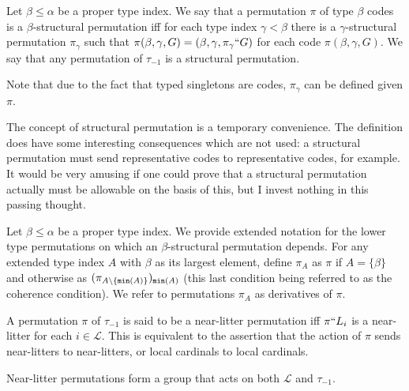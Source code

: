 \begin{definition}
\label {def:structural-perm}
Let $\beta\leq \alpha$ be a proper type index.  We say that a permutation $\pi$ of type $\beta$ codes is a $\beta$-structural permutation iff for each type index $\gamma<\beta$ there is a $\gamma$-structural permutation $\pi_\gamma$ such that
$\pi(\beta,\gamma,G) = (\beta,\gamma,\pi_\gamma``G)$ for each code $\pi(\beta,\gamma,G)$.  We say that any permutation of $\tau_{-1}$ is a structural permutation.

Note that due to the fact that typed singletons are codes, $\pi_\gamma$ can be defined given $\pi$.
\end{definition}

The concept of structural permutation is a temporary convenience.  The definition does have some interesting consequences which are not used:  a structural permutation must send representative codes to representative codes, for example.  It would be very amusing if one could prove that a structural permutation actually must be allowable on the basis of this,  but I invest nothing in this passing thought.

\begin{definition}
\label {def:derivative}
Let $\beta\leq \alpha$ be a proper type index.  We provide extended notation for the lower type permutations on which an $\beta$-structural permutation depends.
For any extended type index $A$ with $\beta$ as its largest element, define $\pi_A$ as $\pi$ if $A = \{\beta\}$
and otherwise as $(\pi_{A \setminus \{{\tt min}(A)\}})_{{\tt min}(A)}$ (this last condition being referred to as the coherence condition).  We refer to permutations $\pi_A$ as derivatives of $\pi$.
\end{definition}

\begin{definition}
\label {def:near-litter-perm}
\leanok
{}
A permutation $\pi$ of $\tau_{-1}$ is said to be a near-litter permutation iff $\pi``L_i$ is a near-litter for each $i \in \mathcal L$.  This is equivalent to the assertion that the action of $\pi$ sends near-litters to near-litters, or local cardinals to local cardinals.

Near-litter permutations form a group that acts on both $\mathcal L$ and $\tau_{-1}$.
\end{definition}

